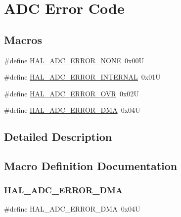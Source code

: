 \hypertarget{group___a_d_c___error___code}{}\section{A\+DC Error Code}
\label{group___a_d_c___error___code}
\subsection*{Macros}
\begin{DoxyCompactItemize}
\item 
\#define \hyperlink{group___a_d_c___error___code_ga93b4576d46ee0f8c53b7d69f39778e38}{H\+A\+L\+\_\+\+A\+D\+C\+\_\+\+E\+R\+R\+O\+R\+\_\+\+N\+O\+NE}~0x00U
\item 
\#define \hyperlink{group___a_d_c___error___code_ga7182f9ffc028f217db8724c7bc348f2f}{H\+A\+L\+\_\+\+A\+D\+C\+\_\+\+E\+R\+R\+O\+R\+\_\+\+I\+N\+T\+E\+R\+N\+AL}~0x01U
\item 
\#define \hyperlink{group___a_d_c___error___code_ga30ce24556ebd3c0341558c700a3b9add}{H\+A\+L\+\_\+\+A\+D\+C\+\_\+\+E\+R\+R\+O\+R\+\_\+\+O\+VR}~0x02U
\item 
\#define \hyperlink{group___a_d_c___error___code_gaea82628f53a8e30db3f3426922acf60f}{H\+A\+L\+\_\+\+A\+D\+C\+\_\+\+E\+R\+R\+O\+R\+\_\+\+D\+MA}~0x04U
\end{DoxyCompactItemize}


\subsection{Detailed Description}


\subsection{Macro Definition Documentation}
\mbox{\label{group___a_d_c___error___code_gaea82628f53a8e30db3f3426922acf60f}} 
\subsubsection{\texorpdfstring{H\+A\+L\+\_\+\+A\+D\+C\+\_\+\+E\+R\+R\+O\+R\+\_\+\+D\+MA}{HAL\_ADC\_ERROR\_DMA}}
{\footnotesize\ttfamily \#define H\+A\+L\+\_\+\+A\+D\+C\+\_\+\+E\+R\+R\+O\+R\+\_\+\+D\+MA~0x04U}

